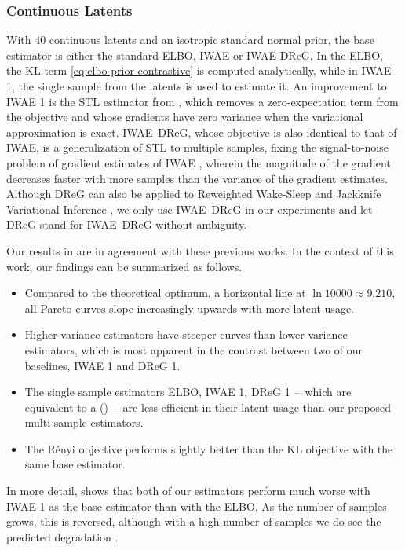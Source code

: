 \subsubsection{Continuous Latents}
With 40 continuous latents and an isotropic standard normal prior, the base estimator is either the standard ELBO, IWAE or IWAE-DReG.
In the ELBO, the KL term \eqref{eq:elbo-prior-contrastive} is computed analytically, while in IWAE 1, the single sample from the latents is used to estimate it.
An improvement to IWAE 1 is the STL estimator from \citet{roeder2017sticking}, which removes a zero-expectation term from the objective and whose gradients have zero variance when the variational approximation is exact.
IWAE--DReG, whose objective is also identical to that of IWAE, is a generalization of STL to multiple samples, fixing the signal-to-noise problem of gradient estimates of IWAE \citep{rainforth2018tighter}, wherein the magnitude of the gradient decreases faster with more samples than the variance of the gradient estimates.
Although DReG can also be applied to Reweighted Wake-Sleep \citep{bornschein2014reweighted} and Jackknife Variational Inference \citep{nowozin2018debiasing}, we only use IWAE--DReG in our experiments and let DReG stand for IWAE--DReG without ambiguity.

Our results in  are in agreement with these previous works.
In the context of this work, our findings can be summarized as follows.
\begin{itemize}
\item Compared to the theoretical optimum, a horizontal line at $\ln 10000 \approx 9.210$, all Pareto curves slope increasingly upwards with more latent usage.
\item Higher-variance estimators have steeper curves than lower variance estimators, which is most apparent in the contrast between two of our baselines, IWAE 1 and DReG 1.
\item The single sample estimators ELBO, IWAE 1, DReG 1 --~which are equivalent to a \betavae{} ()~-- are less efficient in their latent usage than our proposed multi-sample estimators.
\item The Rényi objective performs slightly better than the KL objective with the same base estimator.
\end{itemize}

In more detail,  shows that both of our estimators perform much worse with IWAE 1 as the base estimator than with the ELBO.
As the number of samples grows, this is reversed, although with a high number of samples we do see the predicted degradation \citep{rainforth2018tighter}.

